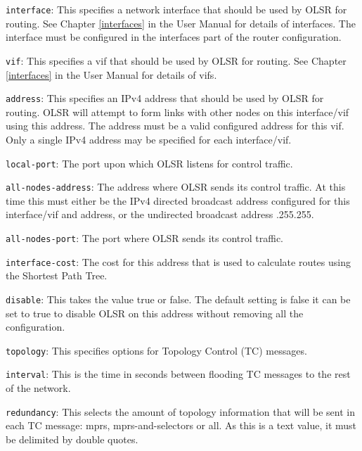 \begin{description}
\item{\tt interface}: This specifies a network interface that should
  be used by OLSR for routing.  See Chapter \ref{interfaces} in
  the User Manual for details of interfaces.  The interface must be configured
  in the {\stt interfaces} part of the router configuration.
\begin{description}
\item{\tt vif}: This specifies a vif that should be used by OLSR for routing.
  See Chapter \ref{interfaces} in the User Manual for details of vifs.
\begin{description}
\item{\tt address}: This specifies an IPv4 address that should be used
  by OLSR for routing.  OLSR will attempt to form links with other nodes
  on this {\stt interface/vif} using this {\stt address}.  The address must be a
  valid configured address for this vif.
  Only a single IPv4 address may be specified for each interface/vif.
\begin{description}
\item{\tt local-port}:  The port upon which OLSR listens for control traffic.
\item{\tt all-nodes-address}:  The address where OLSR sends its
  control traffic.
  At this time this must either be the IPv4 directed broadcast address
  configured for this {\stt interface/vif} and {\stt address}, or the undirected
  broadcast address {.255.255}.
\item{\tt all-nodes-port}:  The port where OLSR sends its control traffic.
\item{\tt interface-cost}: The cost for this address that is used to
calculate routes using the Shortest Path Tree.
\item{\tt disable}:  This takes the value {\stt true} or {\stt
false}. The default setting is {\stt false} it can be set to {\stt
true} to disable OLSR on this {\stt address} without removing all the configuration.
\end{description}
\end{description}
\end{description}

\item{\tt topology}: This specifies options for Topology Control (TC)
  messages.
\begin{description}
\item{\tt interval}: This is the time in seconds between flooding
  TC messages to the rest of the network.
\item{\tt redundancy}: This selects the amount of topology information
  that will be sent in each TC message: {\stt mprs},
  {\stt mprs-and-selectors} or {\stt all}.
  As this is a text value, it must be delimited by double quotes.
\end{description}


\end{description}
